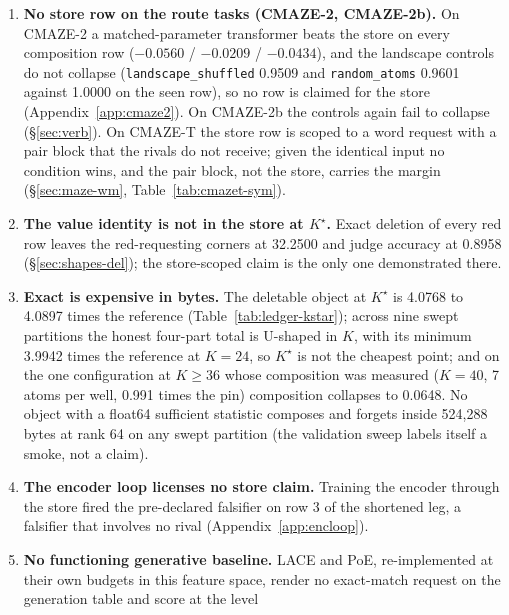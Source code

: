 \documentclass{article} %
\newcommand{\Kstar}{\ensuremath{K^{\star}}}
\begin{document}
\begin{enumerate}[leftmargin=*,itemsep=1pt]
\item \textbf{No store row on the route tasks (CMAZE-2, CMAZE-2b).} On CMAZE-2 a matched-parameter transformer beats the
  store on every composition row ($-0.0560$ / $-0.0209$ / $-0.0434$), and the landscape controls do
  not collapse (\texttt{landscape\_shuffled} 0.9509 and \texttt{random\_atoms} 0.9601 against
  1.0000 on the seen row), so no row is claimed for the store (Appendix~\ref{app:cmaze2}). On
  CMAZE-2b the controls again fail to collapse (\S\ref{sec:verb}). %
  On CMAZE-T the store row is scoped to a word request with a pair block that the rivals do not
  receive; given the identical input no condition wins, and the pair block, not the store, carries
  the margin (\S\ref{sec:maze-wm}, Table~\ref{tab:cmazet-sym}). %
\item \textbf{The value identity is not in the store at $\Kstar$.} Exact deletion of every red
  row leaves the red-requesting corners at 32.2500 and judge accuracy at 0.8958
  (\S\ref{sec:shapes-del}); the store-scoped claim is the only one demonstrated there.
\item \textbf{Exact is expensive in bytes.} The deletable object at $\Kstar$ is 4.0768 to 4.0897
  times the reference (Table~\ref{tab:ledger-kstar}); across nine swept partitions the honest
  four-part total is U-shaped in $K$, with its minimum 3.9942 times the reference at $K=24$, so
  $\Kstar$ is not the cheapest point; and on the one configuration at $K\ge36$ whose composition
  was measured ($K=40$, 7 atoms per well, 0.991 times the pin) composition collapses to 0.0648.
  No object with a float64 sufficient statistic composes and forgets inside 524,288 bytes at rank
  64 on any swept partition (the validation sweep labels itself a smoke, not a claim).
\item \textbf{The encoder loop licenses no store claim.} Training the encoder through the store
  fired the pre-declared falsifier on row 3 of the shortened leg, a falsifier that involves no rival %
  (Appendix~\ref{app:encloop}).
\item \textbf{No functioning generative baseline.} LACE and PoE, re-implemented at their own budgets
  in this feature space, render no exact-match request on the generation table and score at the level

\end{enumerate}
\end{document}
